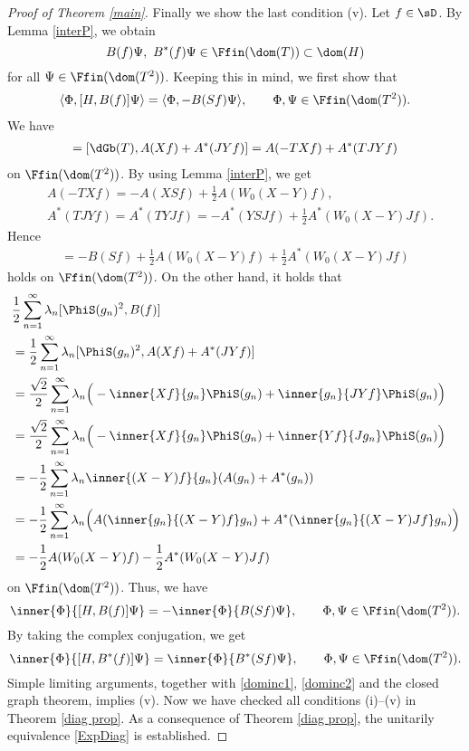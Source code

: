 \documentclass[12pt,draft]{article}
\theoremstyle{plain}
\numberwithin{equation}{section}
\theoremstyle{remark}
\begin{document}
\begin{proof}[Proof of Theorem \ref{main}]
Finally we show the last condition (v). 
Let $f\in\sD $.
By Lemma \ref{interP}, we obtain 
\[
B(f)\Psi,\ B^*(f)\Psi\in\Ffin(\dom(T))\subset\dom(H)
\]
for all $\Psi\in\Ffin(\dom(T^2))$.
Keeping this in mind, we first show that
\begin{align*}
  \langle\Phi,[H,B(f)]\Psi\rangle = \langle\Phi,-B(Sf)\Psi\rangle, \qquad\Phi,\Psi\in\Ffin(\dom(T^2)).
\end{align*} 
We have
\begin{align*}
 [\dGb(T),B(f)] 
= [\dGb(T),A(Xf)+A^*(JYf)] 
= A(-TXf)+A^*(TJYf) 
\end{align*}
on $\Ffin(\dom(T^2))$.
By using Lemma \ref{interP}, we get
\begin{align*}
&  A(-TXf) = -A(XSf) + \frac{1}{2}A(W_0(X-Y)f), \\
&  A^*(TJYf) = A^*(TYJf) = -A^*(YSJf) + \frac{1}{2}A^*(W_0(X-Y)Jf).
\end{align*}
Hence
\begin{align*}
 [\dGb(T),B(f)] 
 = -B(Sf) + \frac{1}{2}A(W_0(X-Y)f) + \frac{1}{2}A^*(W_0(X-Y)Jf)
\end{align*}
holds on $\Ffin(\dom(T^2))$. On the other hand, it holds that
\begin{align*}
&\frac{1}{2}\sum_{n=1}^\infty\lambda_n [\PhiS(g_n)^2,B(f)] \\
&= \frac{1}{2}\sum_{n=1}^\infty\lambda_n [\PhiS(g_n)^2,A(Xf)+A^*(JYf)] \\
&= \frac{\sqrt{2}}{2} \sum_{n=1}^\infty\lambda_n \Big( -\inner{Xf}{g_n}\PhiS(g_n) + \inner{g_n}{JYf}\PhiS(g_n) \Big) \\
&= \frac{\sqrt{2}}{2} \sum_{n=1}^\infty\lambda_n \Big( -\inner{Xf}{g_n}\PhiS(g_n) + \inner{Yf}{Jg_n}\PhiS(g_n) \Big) \\
&= -\frac{1}{2} \sum_{n=1}^\infty\lambda_n \inner{(X-Y)f}{g_n} (A(g_n)+A^*(g_n)) \\
&= -\frac{1}{2}\sum_{n=1}^\infty\lambda_n \Big( A(\inner{g_n}{(X-Y)f}g_n) 
   + A^*(\inner{g_n}{(X-Y)Jf}g_n) \Big) \\
&= -\frac{1}{2}A(W_0(X-Y)f)-\frac{1}{2}A^*(W_0(X-Y)Jf)
\end{align*}
on $\Ffin(\dom(T^2))$. Thus, we have
\begin{equation*}
  \inner{\Phi}{[H,B(f)]\Psi} = -\inner{\Phi}{B(Sf)\Psi}, 
  \qquad {\Phi,\Psi} \in\Ffin(\dom(T^2)).
\end{equation*}
By taking the complex conjugation, we get
\begin{equation*}
  \inner{\Phi}{[H,B^*(f)]\Psi} = \inner{\Phi}{B^*(Sf)\Psi}, \qquad {\Phi,\Psi} \in\Ffin(\dom(T^2)).
\end{equation*}
Simple limiting arguments, together with \eqref{dominc1}, \eqref{dominc2} and the closed graph theorem, implies (v).
Now we have checked all conditions (i)--(v) in Theorem \ref{diag prop}.
As a consequence of Theorem \ref{diag prop}, the unitarily equivalence \eqref{ExpDiag} is established.
\end{proof}
\end{document}
